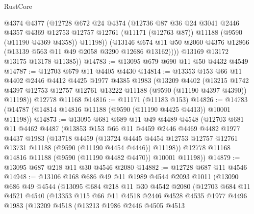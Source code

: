 \begin{lexlean}{RustCore}
\begin{coremodule}
            @4374
            @4377
            (@12728
              @672
              @24
              @4374
              (@12736
                @87
                @36
                @24
                @3041
                @2446
                @4357
                @4369
                @12753
                @12757
                @12761
                (@11171 (@12763 @87))
                @11188
                (@9590 (@11190 @4369 @4358))
                @11198))
            (@13146
              @674
              @11
              @50
              @2060
              @4376
              @12866
              (@13139 @563 @11 @49 @2058 @3290 @12686 @13162))))
        @13169
        @13172
        @13175
        @13178
        @11385))
@14783 := @13095 @679 @690 @11 @50 @4432 @4549
@14787 := @12703 @679 @11 @4405 @4430
@14814 := @13353
    @153
    @66
    @11
    @4402
    @2446
    @4412
    @4425
    @1977
    @4385
    @1983
    (@13209
      @4402
      (@13215 @1742 @4397 @12753 @12757 @12761 @13222 @11188 (@9590 (@11190 @4397 @4390)) @11198))
    @12778
    @11168
@14816 := @11171 (@11183 @153)
@14826 := @14783 (@14787 (@14814 @14816 @11188 (@9590 (@11190 @4425 @4413)) @10001 @11198))
@14873 := @13095
    @681
    @689
    @11
    @49
    @4489
    @4548
    (@12703
      @681
      @11
      @4462
      @4487
      (@13853
        @153
        @66
        @11
        @4459
        @2446
        @4469
        @4482
        @1977
        @4437
        @1983
        (@13718
          @4459
          (@13724
            @4445
            @4454
            @12753
            @12757
            @12761
            @13731
            @11188
            (@9590 (@11190 @4454 @4446))
            @11198))
        @12778
        @11168
        @14816
        @11188
        (@9590 (@11190 @4482 @4470))
        @10001
        @11198))
@14879 := @13095 @687 @218 @11 @30 @4546 @2080
@14882 := @12728 @687 @11 @4546
@14948 := @13106
    @168
    @686
    @49
    @11
    @1989
    @4544
    @2093
    @1011
    (@13090
      @686
      @49
      @4544
      (@13095
        @684
        @218
        @11
        @30
        @4542
        @2080
        (@12703
          @684
          @11
          @4521
          @4540
          (@13353
            @115
            @66
            @11
            @4518
            @2446
            @4528
            @4535
            @1977
            @4496
            @1983
            (@13209
              @4518
              (@13213
                @1986
                @2446
                @4505
                @4513

\end{coremodule}
\end{lexlean}
